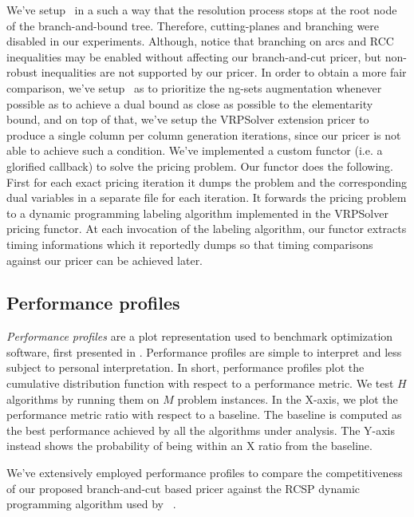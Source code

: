 We've setup \bapcod\ in a such a way that the resolution process stops at the root
node of the branch-and-bound tree.
Therefore, cutting-planes and branching were disabled in our experiments.
Although, notice that branching on arcs and RCC inequalities may be
enabled without affecting our branch-and-cut pricer, but non-robust
inequalities are not supported by our pricer.
In order to obtain a more fair comparison, we've setup \bapcod\ as to prioritize
the ng-sets augmentation whenever possible as to achieve a dual bound as close
as possible to the elementarity bound, and on top of that,
we've setup the VRPSolver extension pricer to produce a single column
per column generation iterations, since our pricer is not able to achieve
such a condition.
We've implemented a custom functor (i.e. a glorified callback) to solve the pricing problem.
Our functor does the following.
First for each exact pricing iteration it dumps the problem and the corresponding dual variables
in a separate file for each iteration.
It forwards the pricing problem to a dynamic programming labeling algorithm
implemented in the VRPSolver pricing functor.
At each invocation of the labeling algorithm, our functor extracts timing informations
which it reportedly dumps so that timing comparisons against our pricer can be achieved later.

\subsection{Performance profiles}
\label{sec:results-performance-profiles}

\textit{Performance profiles} are a plot representation used to benchmark optimization software,
first presented in \textcite{dolan2002}.
Performance profiles are simple to interpret and less subject to personal interpretation.
In short, performance profiles plot the cumulative distribution function with respect to a performance metric.
We test $H$ algorithms by running them on $M$ problem instances.
In the X-axis, we plot the performance metric ratio with respect to a baseline.
The baseline is computed as the best performance achieved by all the algorithms under analysis.
The Y-axis instead shows the probability of being within an X ratio from the baseline.

\medskip

We've extensively employed performance profiles to compare the competitiveness of
our proposed branch-and-cut based pricer
against the RCSP dynamic programming algorithm used by \bapcod\ \parencite{pessoa2020a}.

